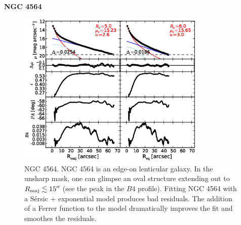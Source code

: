 \documentclass[preprint2]{emulateapj}
\newcommand{\fitfigurewidth}{0.8\textwidth}
\begin{document}
  \clearpage\newpage\noindent
  {\bf NGC 4564 \\}

  \begin{figure}[h]
  \begin{center}
  \includegraphics[width=\fitfigurewidth]{images/n4564_1Dfit.eps}
  \caption{NGC 4564.
  NGC 4564 is an edge-on lenticular galaxy.
  In the unsharp mask, one can glimpse an oval structure extending out to $R_{\rm maj} \lesssim 15''$ (see the peak in the $B4$ profile).
  Fitting NGC 4564 with a S\'ersic + exponential model produces bad residuals.
  The addition of a Ferrer function to the model dramatically improves the fit and smoothes the residuals.
  }
  \end{center}
  \end{figure}
\end{document}
